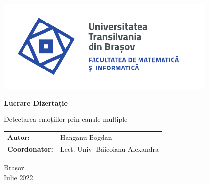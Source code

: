 \begin{titlepage}
	
	\vspace*{-3cm}
	\hspace{-2cm}
	\includegraphics[width=0.8\linewidth]{./images/Logo-UT-MI-SPOT-RO}
	
	\begin{center}
		\Huge
		
		\vspace{2cm}
		
		\textbf{Lucrare Dizertație}
		
		\vspace{1cm} 
		
		\LARGE Detectarea emoțiilor prin canale multiple
		
		\vfill
		
		\Large
		\begin{tabular}{ll}
			\textbf{Autor:}&Hanganu Bogdan\\
			\textbf{Coordonator:}&Lect. Univ. Băicoianu Alexandra
		\end{tabular}
		
		\vfill
		
		\Large
		Brașov\\
		Iulie 2022
		
	\end{center}
\end{titlepage}